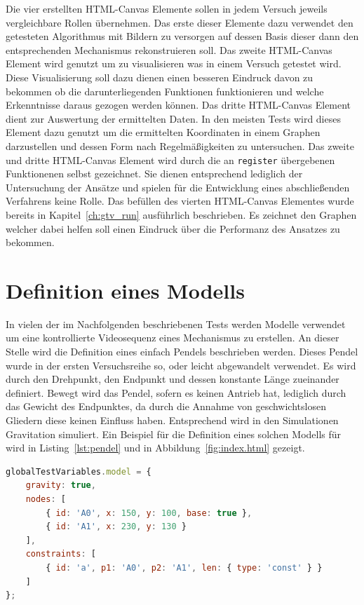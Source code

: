 Die vier erstellten HTML-Canvas Elemente sollen in jedem Versuch jeweils vergleichbare Rollen übernehmen.
Das erste dieser Elemente dazu verwendet den getesteten Algorithmus mit Bildern zu versorgen auf dessen Basis dieser dann den entsprechenden Mechanismus rekonstruieren soll.
Das zweite HTML-Canvas Element wird genutzt um zu visualisieren was in einem Versuch getestet wird.
Diese Visualisierung soll dazu dienen einen besseren Eindruck davon zu bekommen ob die darunterliegenden Funktionen funktionieren und welche Erkenntnisse daraus gezogen werden können.
Das dritte HTML-Canvas Element dient zur Auswertung der ermittelten Daten.
In den meisten Tests wird dieses Element dazu genutzt um die ermittelten Koordinaten in einem Graphen darzustellen und dessen Form nach Regelmä{\ss}igkeiten zu untersuchen.
Das zweite und dritte HTML-Canvas Element wird durch die an \lstinline{register} übergebenen Funktionenen selbst gezeichnet.
Sie dienen entsprechend lediglich der Untersuchung der Ansätze und spielen für die Entwicklung eines abschlie{\ss}enden Verfahrens keine Rolle.
Das befüllen des vierten HTML-Canvas Elementes wurde bereits in Kapitel~\ref{ch:gtv_run} ausführlich beschrieben.
Es zeichnet den Graphen welcher dabei helfen soll einen Eindruck über die Performanz des Ansatzes zu bekommen.

\section{Definition eines  Modells}

In vielen der im Nachfolgenden beschriebenen Tests werden  Modelle verwendet um eine kontrollierte Videosequenz eines Mechanismus zu erstellen.
An dieser Stelle wird die Definition eines einfach Pendels beschrieben werden.
Dieses Pendel wurde in der ersten Versuchsreihe so, oder leicht abgewandelt verwendet.
Es wird durch den Drehpunkt, den Endpunkt und dessen konstante Länge zueinander definiert.
Bewegt wird das Pendel, sofern es keinen Antrieb hat, lediglich durch das Gewicht des Endpunktes, da durch die Annahme von geschwichtslosen Gliedern diese keinen Einfluss haben.
Entsprechend wird in den  Simulationen Gravitation simuliert.
Ein Beispiel für die Definition eines solchen Modells für  wird in Listing~\ref{lst:pendel} und in Abbildung~\ref{fig:index.html} gezeigt.

\begin{lstlisting}[language=JavaScript, caption={Definition eines einfachen Pendels in \name{mec2}, inklusive animation.}, label={lst:pendel}]
globalTestVariables.model = {
    gravity: true,
    nodes: [
        { id: 'A0', x: 150, y: 100, base: true },
        { id: 'A1', x: 230, y: 130 }
    ],
    constraints: [
        { id: 'a', p1: 'A0', p2: 'A1', len: { type: 'const' } }
    ]
};
\end{lstlisting}

